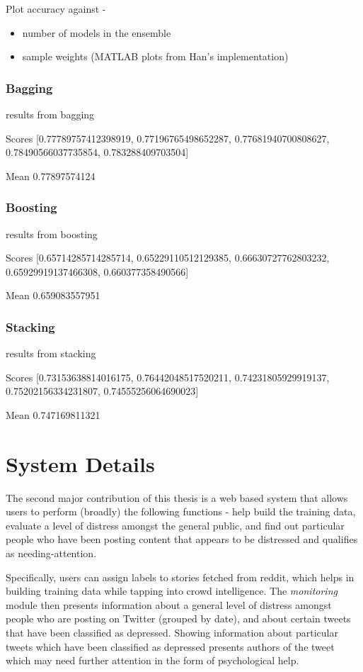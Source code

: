 Plot accuracy against -
\begin{itemize}
    \item{number of models in the ensemble}
    \item{sample weights (MATLAB plots from Han's implementation)}
\end{itemize}

\subsubsection{Bagging}
results from bagging

Scores [0.77789757412398919, 0.77196765498652287, 0.77681940700808627, 0.78490566037735854, 0.783288409703504]

Mean 0.77897574124

\subsubsection{Boosting}
results from boosting

Scores [0.65714285714285714, 0.65229110512129385, 0.66630727762803232, 0.65929919137466308, 0.660377358490566]

Mean 0.659083557951

\subsubsection{Stacking}
results from stacking

Scores [0.73153638814016175, 0.76442048517520211, 0.74231805929919137, 0.75202156334231807, 0.74555256064690023]

Mean 0.747169811321

\section{System Details}

The second major contribution of this thesis is a web based system that allows users to perform (broadly) the following functions - help build the training data, evaluate a level of distress amongst the general public, and find out particular people who have been posting content that appears to be distressed and qualifies as needing-attention.

Specifically, users can assign labels to stories fetched from reddit, which helps in building training data while tapping into crowd intelligence. The \emph{monitoring} module then presents information about a general level of distress amongst people who are posting on Twitter (grouped by date), and about certain tweets that have been classified as depressed. Showing information about particular tweets which have been classified as depressed presents authors of the tweet which may need further attention in the form of psychological help.

